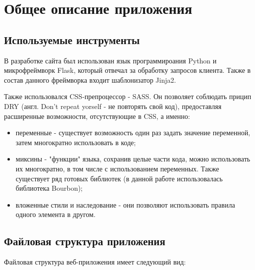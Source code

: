 \chapter{Общее описание приложения}
\section{Используемые инструменты}

В разработке сайта был использован язык программироания Python и микрофреймворк Flask, который отвечал за обработку запросов клиента. Также в состав данного фреймворка входит шаблонизатор Jinja2.

Также использовался CSS-препроцессор - SASS. Он позволяет соблюдать прицип DRY (англ. Don't repeat yorself - не повторять свой код), предоставляя расширенные возможности, отсутствующие в CSS, а именно:
\begin{itemize}
	\item переменные - существует возможность один раз задать значение переменной, затем многократно использовать в коде;
	\item миксины - "функции" языка, сохранив целые части кода, можно использовать их многократно, в том числе с использованием переменных. Также существует ряд готовых библиотек (в данной работе использовалась библиотека Bourbon);
	\item вложенные стили и наследование - они позволяют использовать правила одного элемента в другом.
\end{itemize}

\section{Файловая структура приложения}
Файловая структура веб-приложения имеет следующий вид:

